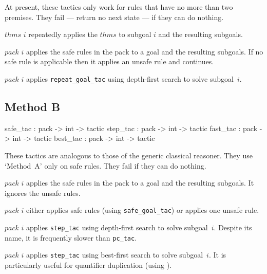 At present, these tactics only work for rules that have no more than two
premises.  They fail --- return no next state --- if they can do nothing.
\begin{ttdescription}
\item[\ttindexbold{reresolve_tac} $thms$ $i$] 
repeatedly applies the $thms$ to subgoal $i$ and the resulting subgoals.

\item[\ttindexbold{repeat_goal_tac} $pack$ $i$] 
applies the safe rules in the pack to a goal and the resulting subgoals.
If no safe rule is applicable then it applies an unsafe rule and continues.

\item[\ttindexbold{pc_tac} $pack$ $i$] 
applies {\tt repeat_goal_tac} using depth-first search to solve subgoal~$i$.
\end{ttdescription}


\subsection{Method B}
\begin{ttbox} 
safe_tac : pack -> int -> tactic
step_tac : pack -> int -> tactic
fast_tac : pack -> int -> tactic
best_tac : pack -> int -> tactic
\end{ttbox}
These tactics are analogous to those of the generic classical
reasoner.  They use `Method~A' only on safe rules.  They fail if they
can do nothing.
\begin{ttdescription}
\item[\ttindexbold{safe_goal_tac} $pack$ $i$] 
applies the safe rules in the pack to a goal and the resulting subgoals.
It ignores the unsafe rules.  

\item[\ttindexbold{step_tac} $pack$ $i$] 
either applies safe rules (using {\tt safe_goal_tac}) or applies one unsafe
rule.

\item[\ttindexbold{fast_tac} $pack$ $i$] 
applies {\tt step_tac} using depth-first search to solve subgoal~$i$.
Despite its name, it is frequently slower than {\tt pc_tac}.

\item[\ttindexbold{best_tac} $pack$ $i$] 
applies {\tt step_tac} using best-first search to solve subgoal~$i$.  It is
particularly useful for quantifier duplication (using ).
\end{ttdescription}



